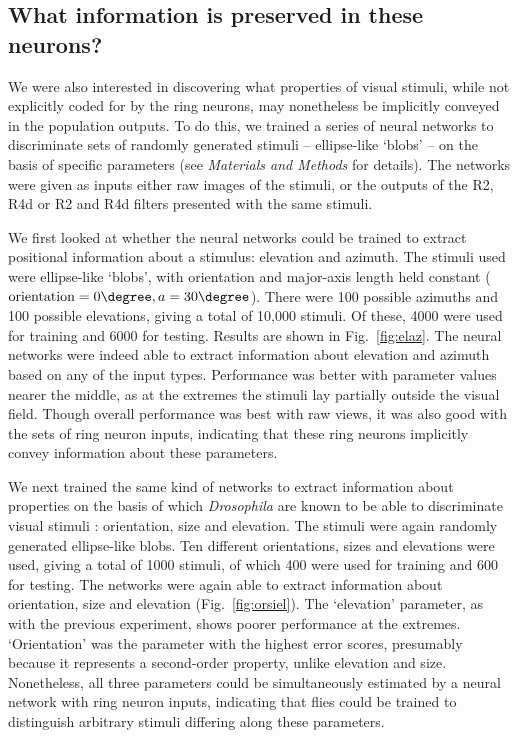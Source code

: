 \subsection{What information is preserved in these neurons?}
We were also interested in discovering what properties of visual stimuli, while not explicitly coded for by the ring neurons, may nonetheless be implicitly conveyed in the population outputs.
To do this, we trained a series of neural networks to discriminate sets of randomly generated stimuli -- ellipse-like `blobs' -- on the basis of specific parameters (see \emph{Materials and Methods} for details).
The networks were given as inputs either raw images of the stimuli, or the outputs of the R2, R4d or R2 and R4d filters presented with the same stimuli.

We first looked at whether the neural networks could be trained to extract positional information about a stimulus: elevation and azimuth.
The stimuli used were ellipse-like `blobs', with orientation and major-axis length held constant ($\mathrm{orientation} = 0\degree, a = 30\degree$).
There were 100 possible azimuths and 100 possible elevations, giving a total of 10,000 stimuli.
Of these, 4000 were used for training and 6000 for testing.
Results are shown in Fig.~\ref{fig:elaz}.
The neural networks were indeed able to extract information about elevation and azimuth based on any of the input types.
Performance was better with parameter values nearer the middle, as at the extremes the stimuli lay partially outside the visual field.
Though overall performance was best with raw views, it was also good with the sets of ring neuron inputs, indicating that these ring neurons implicitly convey information about these parameters.

We next trained the same kind of networks to extract information about properties on the basis of which \emph{Drosophila} are known to be able to discriminate visual stimuli \cite{Pan2009,Liu2006,Ernst1999}: orientation, size and elevation.
The stimuli were again randomly generated ellipse-like blobs.
Ten different orientations, sizes and elevations were used, giving a total of 1000 stimuli, of which 400 were used for training and 600 for testing.
The networks were again able to extract information about orientation, size and elevation (Fig.~\ref{fig:orsiel}).
The `elevation' parameter, as with the previous experiment, shows poorer performance at the extremes.
`Orientation' was the parameter with the highest error scores, presumably because it represents a second-order property, unlike elevation and size.
Nonetheless, all three parameters could be simultaneously estimated by a neural network with ring neuron inputs, indicating that flies could be trained to distinguish arbitrary stimuli differing along these parameters.

